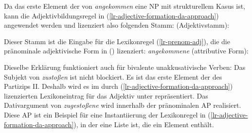 {Da das erste Element der \compsl von \emph{angekommen} eine NP mit strukturellem Kasus ist,
kann die Adjektivbildungsregel in (\ref{lr-adjective-formation-da-approach}) angewendet werden
und lizenziert also folgenden Stamm:
\eas
{} (Adjektivstamm):\\
\zs

\noindent
Dieser Stamm ist die Eingabe für die Lexikonregel (\ref{lr-prenom-adj}),
die die pränominale adjektivische Form in () lizenziert:
\eas
{\em angekommene} (attributive Form):\\
\zs

\noindent
Dieselbe Erklärung funktioniert auch für bivalente unakkusativische Verben:
\z
Das Subjekt von \emph{zustoßen} ist nicht blockiert.
Es ist das erste Element der \compsl des Partizips II.
Deshalb wird es im durch (\ref{lr-adjective-formation-da-approach}) lizenzierten
Lexikoneintrag für das Adjektiv unter \subj repräsentiert.
Das Dativargument von \emph{zugestoßene} wird innerhalb der pränominalen AP realisiert.
Diese AP ist ein Beispiel für eine Instantiierung der Lexikonregel in (\ref{lr-adjective-formation-da-approach}),
in der  eine Liste ist, die ein Element enthält.

}
